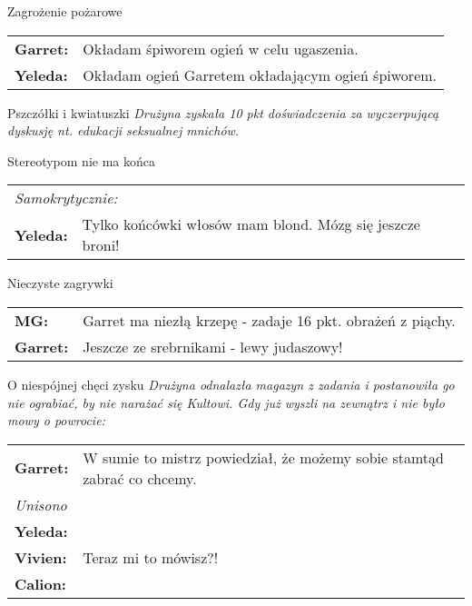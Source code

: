\documentclass[10pt,twoside,twocolumn]{book}
\begin{document}
\begin{rpg-quotebox}{Zagrożenie pożarowe}
   \begin{tabularx}{\columnwidth}{lX}
      \textbf{Garret:} & Okładam śpiworem ogień w celu ugaszenia.\\
      \textbf{Yeleda:} & Okładam ogień Garretem okładającym ogień śpiworem.\\
   \end{tabularx}
\end{rpg-quotebox}

\begin{rpg-quotebox}{Pszczółki i kwiatuszki}
   \textit{Drużyna zyskała 10 pkt doświadczenia za wyczerpującą dyskusję nt. edukacji seksualnej mnichów.}
\end{rpg-quotebox}

\begin{rpg-quotebox}{Stereotypom nie ma końca}
   \begin{tabularx}{\columnwidth}{lX}
      \multicolumn{2}{l}{\textit{Samokrytycznie:}}\\
      \textbf{Yeleda:} & Tylko końcówki włosów mam blond. Mózg się jeszcze broni!\\
   \end{tabularx}
\end{rpg-quotebox}

\begin{rpg-quotebox}{Nieczyste zagrywki}
   \begin{tabularx}{\columnwidth}{lX}
      \textbf{MG:} & Garret ma niezłą krzepę - zadaje 16 pkt. obrażeń z piąchy.\\
      \textbf{Garret:} & Jeszcze ze srebrnikami - lewy judaszowy!\\
   \end{tabularx}
\end{rpg-quotebox}

\begin{rpg-quotebox}{O niespójnej chęci zysku}
   \textit{Drużyna odnalazła magazyn z zadania i postanowiła go nie ograbiać, by nie narażać się Kultowi. Gdy już wyszli na zewnątrz i nie było mowy o powrocie:}\\
   
   \begin{tabularx}{\columnwidth}{lX}
      \textbf{Garret:} & W sumie to mistrz powiedział, że możemy sobie stamtąd zabrać co chcemy.\\
      \multicolumn{2}{l}{\textit{Unisono}}\\
      \textbf{Yeleda:} & \multirow{ 3}{*}{Teraz mi to mówisz?!}\\
      \textbf{Vivien:} & \\
      \textbf{Calion:} & \\
   \end{tabularx}
\end{rpg-quotebox}
\end{document}
